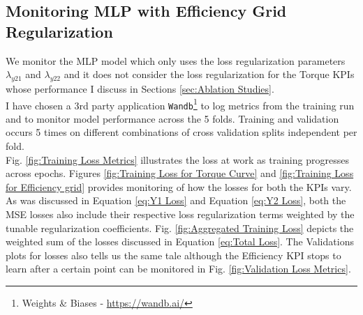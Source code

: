 \documentclass{report} %
\begin{document}
\subsection{Monitoring MLP with Efficiency Grid Regularization}\label{subsec:Monitoring MLP with Efficiency Grid Regularization}

We monitor the \ac{MLP} model which only uses the loss regularization parameters \textit{$\lambda_{y21}$} and \textit{$\lambda_{y22}$} and it does not consider the loss  
regularization for the Torque \ac{KPI}s whose performance I discuss in Sections \ref{sec:Ablation Studies}.\\
I have chosen a 3rd party application \texttt{Wandb}\footnote{Weights \& Biases - \url{https://wandb.ai/}} to log metrics from the training run and to monitor model 
performance across the 5 folds. Training and validation occurs 5 times on different combinations of cross validation splits independent per fold.\\

Fig. \ref{fig:Training Loss Metrics} illustrates the loss at work as training progresses across epochs. 
Figures \ref{fig:Training Loss for Torque Curve} and \ref{fig:Training Loss for Efficiency grid} provides monitoring of how the losses for both the \ac{KPI}s vary. 
As was discussed in Equation \ref{eq:Y1 Loss} and Equation \ref{eq:Y2 Loss}, both the \ac{MSE} losses 
also include their respective loss regularization terms weighted by the tunable regularization coefficients. 
Fig. \ref{fig:Aggregated Training Loss} depicts the weighted sum of the losses discussed in Equation \ref{eq:Total Loss}.
The Validations plots for losses also tells us the same tale although the Efficiency \ac{KPI} stops to learn after a certain point can be monitored in Fig. 
\ref{fig:Validation Loss Metrics}.
\end{document}
